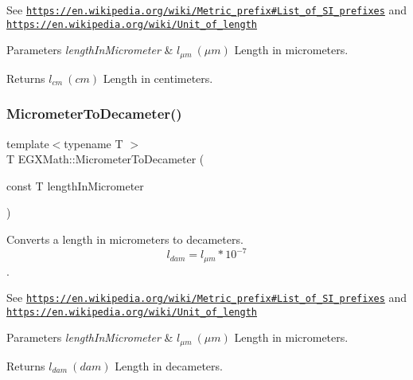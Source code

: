 See \href{https://en.wikipedia.org/wiki/Metric_prefix#List_of_SI_prefixes}{\tt https\+://en.\+wikipedia.\+org/wiki/\+Metric\+\_\+prefix\#\+List\+\_\+of\+\_\+\+S\+I\+\_\+prefixes} and \href{https://en.wikipedia.org/wiki/Unit_of_length}{\tt https\+://en.\+wikipedia.\+org/wiki/\+Unit\+\_\+of\+\_\+length} 
\begin{DoxyParams}{Parameters}
{\em length\+In\+Micrometer} & $ l_{\mu m}\ (\mu m)$ Length in micrometers. \\
\hline
\end{DoxyParams}
\begin{DoxyReturn}{Returns}
$ l_{cm}\ (cm)$ Length in centimeters. 
\end{DoxyReturn}
\mbox{\label{group___e_g_x_math-_conversions-_length_conversions-_micrometer-_s_i_ga871166cc6e314c09456a06cfb84ef62a}} 
\subsubsection{\texorpdfstring{Micrometer\+To\+Decameter()}{MicrometerToDecameter()}}
{\footnotesize\ttfamily template$<$typename T $>$ \\
T E\+G\+X\+Math\+::\+Micrometer\+To\+Decameter (\begin{DoxyParamCaption}\item[{const T}]{length\+In\+Micrometer }\end{DoxyParamCaption})}



Converts a length in micrometers to decameters. \[ l_{dam}=l_{\mu m} * 10^{-7} \]. 

See \href{https://en.wikipedia.org/wiki/Metric_prefix#List_of_SI_prefixes}{\tt https\+://en.\+wikipedia.\+org/wiki/\+Metric\+\_\+prefix\#\+List\+\_\+of\+\_\+\+S\+I\+\_\+prefixes} and \href{https://en.wikipedia.org/wiki/Unit_of_length}{\tt https\+://en.\+wikipedia.\+org/wiki/\+Unit\+\_\+of\+\_\+length} 
\begin{DoxyParams}{Parameters}
{\em length\+In\+Micrometer} & $ l_{\mu m}\ (\mu m)$ Length in micrometers. \\
\hline
\end{DoxyParams}
\begin{DoxyReturn}{Returns}
$ l_{dam}\ (dam)$ Length in decameters. 
\end{DoxyReturn}
\mbox{\label{group___e_g_x_math-_conversions-_length_conversions-_micrometer-_s_i_ga9defee7c838f9b14acd0dc19931309fa}} 
